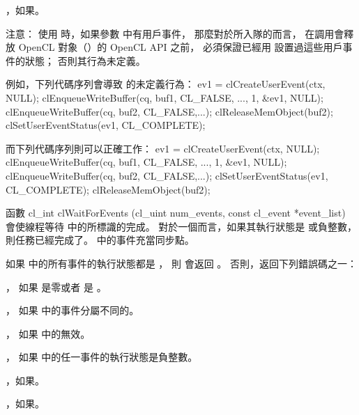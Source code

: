 \item {}，如果\schostfailres。
\stopigBase

注意：
使用  時，如果參數  中有用戶事件，
那麼對於所入隊的而言，
在調用會釋放 OpenCL 對象（）的 OpenCL API 之前，
必須保證已經用  設置過這些用戶事件的狀態；
否則其行為未定義。

例如，下列代碼序列會導致  的未定義行為：
\startclc
ev1 = clCreateUserEvent(ctx, NULL);
clEnqueueWriteBuffer(cq, buf1, CL_FALSE, ...,
				1, &ev1, NULL);
clEnqueueWriteBuffer(cq, buf2, CL_FALSE,...);
clReleaseMemObject(buf2);
clSetUserEventStatus(ev1, CL_COMPLETE);
\stopclc

而下列代碼序列則可以正確工作：
\startclc
ev1 = clCreateUserEvent(ctx, NULL);
clEnqueueWriteBuffer(cq, buf1, CL_FALSE, ...,
				1, &ev1, NULL);
clEnqueueWriteBuffer(cq, buf2, CL_FALSE,...);
clSetUserEventStatus(ev1, CL_COMPLETE);
clReleaseMemObject(buf2);
\stopclc

函數
\startclc
cl_int clWaitForEvents (cl_uint num_events, const cl_event *event_list)
\stopclc
會使線程等待  中的所標識的完成。
對於一個而言，如果其執行狀態是  或負整數，則任務已經完成了。
  中的事件充當同步點。

如果  中的所有事件的執行狀態都是 ，
則  會返回 。
否則，返回下列錯誤碼之一：
\startigBase
\item {}，
如果  是零或者  是 。

\item {}，
如果  中的事件分屬不同的。

\item {}，
如果  中的無效。

\item {}，
如果  中的任一事件的執行狀態是負整數。

\item {}，如果\scdevfailres。

\item {}，如果\schostfailres。
\stopigBase
